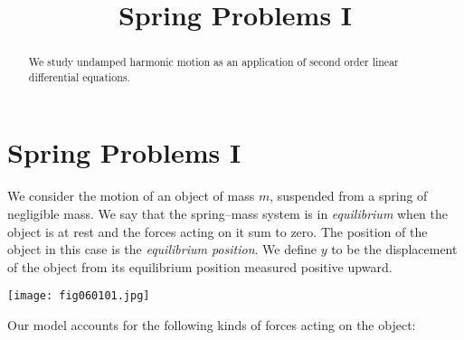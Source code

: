 \documentclass{ximera}
\title{Spring Problems I}
\begin{document}
 
\begin{abstract}
 We study undamped harmonic motion as an application of second order linear differential equations.
\end{abstract}
 
\maketitle
 
\section*{Spring Problems I}
 
 
We consider the motion of an object of mass $m$, suspended from a
spring of negligible mass. We say that the spring--mass system is
in \textit{equilibrium} when the object is at rest and the forces
acting on it sum to zero. The position of the object in this case is
the \textit{equilibrium position}. We define $y$ to be the displacement
of the object from its equilibrium position %
measured positive upward.
 
\begin{image}
  \texttt{[image: fig060101.jpg]}
\end{image}
 
Our model accounts for the following kinds of forces acting on the
object:
 
\end{document}
